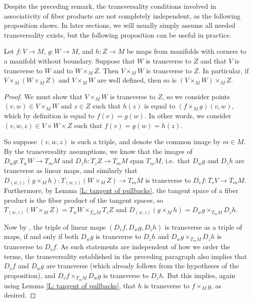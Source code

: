 Despite the preceding remark, the transversality conditions involved in associativity of fiber products are not completely independent, as the following proposition shows. In later sections, we will usually simply assume all needed transversality exists, but the following proposition can be useful in practice.

\begin{proposition}\label{P: 3 out of 4 trans}
Let $f:V\to M$, $g:W\to M$, and $h:Z\to M$ be maps from manifolds with corners to a manifold without boundary. Suppose that $W$ is transverse to $Z$ and that $V$ is transverse to $W$ and to $W\times_MZ$. Then $V\times_MW$ is transverse to $Z$. In particular, if $V\times_M(W\times_MZ)$ and $V\times_MW$ are well defined, then so is $(V\times_MW)\times_M Z$.
\end{proposition}
\begin{proof}
We must show that $V\times_MW$ is transverse to $Z$, so we consider points $(v,w)\in V\times_M W$ and $z\in Z$ such that $h(z)$ is equal to $(f\times_Mg)(v,w)$, which by definition is equal to $f(v)=g(w)$. In other words, we consider  $(v,w,z)\in V\times W\times Z$ such that $f(v)=g(w)=h(z)$.

So suppose $(v,w,z)$ is such a triple, and denote the common image by $m\in M$.  By the transversality assumptions, we know that the images of $D_wg:T_wW\to T_mM$ and $D_zh:T_zZ\to T_mM$ span $T_mM$, i.e.\ that $D_wg$ and $D_zh$ are transverse as linear maps, and similarly that $D_{(w,z)}(g\times_M h):T_{(w,z)}(W\times_M Z)\to T_mM$ is transverse to $D_vf:T_vV\to T_mM$. Furthermore, by  Lemma \ref{L: tangent of pullbacks},  the tangent space of a fiber product is the fiber product of the tangent spaces, so $T_{(w,z)}(W\times_M Z)=T_wW\times_{T_mM}T_zZ$ and $D_{(w,z)}(g\times_M h)=D_wg\times_{T_mM}D_zh$.

Now by \cite[Propositions~4-9]{RamBas09}, the triple of linear maps $(D_vf,D_wg,D_zh)$ is transverse as a triple of maps, if and only if both $D_wg$ is transverse to $D_zh$ and $D_wg\times_{T_mM}D_zh$ is transverse to $D_vf$. As such statements are independent of how we order the terms, the transversality established in the preceding paragraph also implies that $D_vf$ and $D_wg$ are transverse (which already follows from the hypotheses of the proposition), and $D_vf\times_{T_mM}D_wg$ is transverse to $D_zh$. But this implies, again using Lemma \ref{L: tangent of pullbacks}, that $h$ is transverse to $f\times_Mg$, as desired.
\end{proof}


